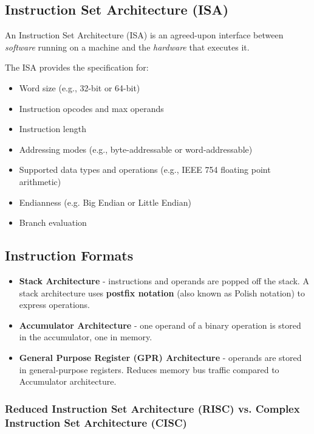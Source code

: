 \documentclass[pdftex,10pt]{article}
\begin{document}
\subsection{Instruction Set Architecture (ISA)}

An Instruction Set Architecture (ISA) is an agreed-upon interface between \textit{software} running on a machine and the \textit{hardware} that executes it.

The ISA provides the specification for:

\begin{itemize}
    \item Word size (e.g., 32-bit or 64-bit)
    \item Instruction opcodes and max operands
    \item Instruction length
    \item Addressing modes (e.g., byte-addressable or word-addressable)
    \item Supported data types and operations (e.g., IEEE 754 floating point arithmetic)
    \item Endianness (e.g. Big Endian or Little Endian)
    \item Branch evaluation
\end{itemize}

\subsection{Instruction Formats}

\begin{itemize}
    \item \textbf{Stack Architecture} - instructions and operands are popped off the stack. A stack architecture uses \textbf{postfix notation} (also known as Polish notation) to express operations.
    \item \textbf{Accumulator Architecture} - one operand of a binary operation is stored in the accumulator, one in memory.
    \item \textbf{General Purpose Register (GPR) Architecture} - operands are stored in general-purpose registers. Reduces memory bus traffic compared to Accumulator architecture.
\end{itemize}

\subsubsection{Reduced Instruction Set Architecture (RISC) vs. Complex Instruction Set Architecture (CISC)}
\end{document}
